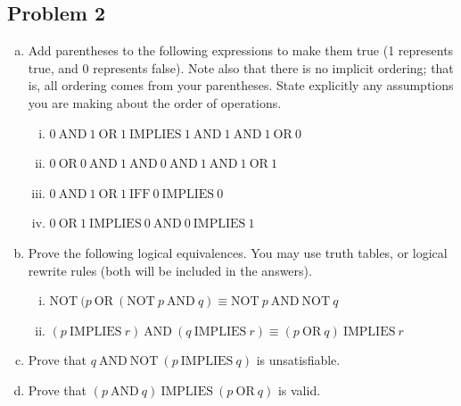 \documentclass[12pt,letterpaper]{article}
\newcounter{enum22i}
\begin{document}
\subsection*{Problem 2}
{
\nopagebreak 

{\setcounter{enum22i}{0}

      \begin{enumerate}[a.]
        \item Add parentheses to the following expressions to make them true (1 represents
           true, and 0 represents false). Note also that there is no implicit
           ordering; that is, all ordering comes from your parentheses. State
           explicitly any assumptions you are making about the order of operations.
          \begin{enumerate}[i.]
\renewcommand{\land}{\mathrm {\ AND\ }}
\renewcommand{\lor}{\mathrm {\ OR\ }}
\renewcommand{\Rightarrow}{\mathrm {\ IMPLIES\ }}
\renewcommand{\Leftrightarrow}{\mathrm {\ IFF\ }}

          \item $0 \land 1 \lor 1 \Rightarrow 1 \land 1 \land 1 \lor 0$
          \item $0 \lor 0 \land 1 \land 0 \land 1 \land 1 \lor 1$
          \item $0 \land 1 \lor 1 \Leftrightarrow 0 \Rightarrow 0$
          \item $0 \lor 1 \Rightarrow 0 \land 0 \Rightarrow 1$
          \end{enumerate}
	\item Prove the following logical equivalences. You may use truth tables, or logical rewrite rules (both will be included in the answers).
	
\renewcommand{\land}{\mathrm {\ AND\ }}
\renewcommand{\lor}{\mathrm {\ OR\ }}
\renewcommand{\Rightarrow}{\mathrm {\ IMPLIES\ }}
\renewcommand{\Leftrightarrow}{\mathrm {\ IFF\ }}
\renewcommand{\lnot}{\mathrm {NOT\ }}
	  \begin{enumerate}[i.]	  
	  
		\item $\lnot (p \lor (\lnot p \land q) \equiv \lnot p \land \lnot q$
		\item $(p \Rightarrow r) \land (q \Rightarrow r) \equiv (p \lor q) \Rightarrow r$
	  \end{enumerate}
	\item Prove that $q \land \lnot (p \Rightarrow q)$ is unsatisfiable.
	\item Prove that $(p \land q) \Rightarrow (p \lor q)$ is valid.
	\end{enumerate}
    
}
}
\end{document}
